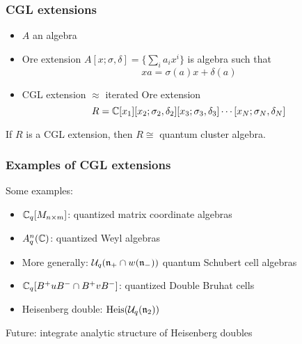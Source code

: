 \documentclass[aspectratio=169]{beamer}
\begin{document}
\begin{frame}
	\frametitle{CGL extensions}
	\begin{itemize}
		\item $A$ an algebra
		\item Ore extension $A[x; \sigma, \delta] = \{\sum_i a_i x^i\}$ is algebra such that
		      \begin{equation*}
			      x a = \sigma(a) x + \delta(a)
		      \end{equation*}
		\item CGL extension $\approx$ iterated Ore extension
		      \begin{equation*}
			      R = \mathbb{C}[x_1][x_2; \sigma_2, \delta_2][x_3; \sigma_3, \delta_3] \dotsb [x_N; \sigma_N, \delta_N]
		      \end{equation*}
	\end{itemize}
	\begin{theorem}
		If $R$ is a CGL extension, then $R \cong$ quantum cluster algebra.
	\end{theorem}

\end{frame}

\begin{frame}
	\frametitle{Examples of CGL extensions}

	Some examples:
	\begin{itemize}
		\item $\mathbb{C}_q[M_{n\times m}]$: quantized matrix coordinate algebras
		\item $A^n_q(\mathbb{C})$: quantized Weyl algebras
		\item More generally: $\mathcal{U}_q(\mathfrak{n}_+ \cap w(\mathfrak{n}_-))$ quantum Schubert cell algebras
		\item $\mathbb{C}_q[B^+ u B^- \cap B^+ v B^-]$: quantized Double Bruhat cells \pause
		\item Heisenberg double: $\operatorname{Heis}(\mathcal{U}_q(\mathfrak{n}_2))$
	\end{itemize}
	\medskip
	\pause
	Future: integrate analytic structure of Heisenberg doubles

\end{frame}


\end{document}

